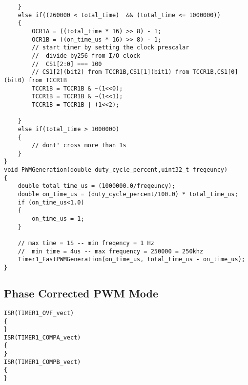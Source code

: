 \documentclass{article}
\begin{document}
\begin{verbatim}
	}
	else if((260000 < total_time)  && (total_time <= 1000000))
	{
		OCR1A = ((total_time * 16) >> 8) - 1;
		OCR1B = ((on_time_us * 16) >> 8) - 1;
		// start timer by setting the clock prescalar
		//  divide by256 from I/O clock
		//  CS1[2:0] === 100
		// CS1[2](bit2) from TCCR1B,CS1[1](bit1) from TCCR1B,CS1[0](bit0) from TCCR1B
		TCCR1B = TCCR1B & ~(1<<0);
		TCCR1B = TCCR1B & ~(1<<1);
		TCCR1B = TCCR1B | (1<<2);
		
	}
	else if(total_time > 1000000)
	{
		// dont' cross more than 1s
	}
}
void PWMGeneration(double duty_cycle_percent,uint32_t freqeuncy)
{
	double total_time_us = (1000000.0/freqeuncy);
	double on_time_us = (duty_cycle_percent/100.0) * total_time_us;
	if (on_time_us<1.0)
	{
		on_time_us = 1;
	}
	
	// max time = 1S -- min freqency = 1 Hz
	//  min time = 4us -- max frequency = 250000 = 250khz
	Timer1_FastPWMGeneration(on_time_us, total_time_us - on_time_us);
}
\end{verbatim}


\subsection{Phase Corrected PWM Mode}
\begin{verbatim}
ISR(TIMER1_OVF_vect)
{
} 
ISR(TIMER1_COMPA_vect)
{
}
ISR(TIMER1_COMPB_vect)
{
}
\end{verbatim}
\end{document}
